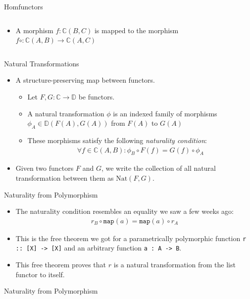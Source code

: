 \documentclass[aspectratio=169]{beamer} %
\newcommand{\bC}{\mathbb{C}}
\newcommand{\bD}{\mathbb{D}}
\begin{document}
{\begin{frame}[fragile]{Homfunctors}
\begin{columns}
\begin{itemize}
\begin{itemize}
    \item A morphism $f : \bC(B,C)$ is mapped to the morphism $f \circ : \bC(A,B) \to \bC(A,C)$
  \end{itemize}
 \end{itemize}
 \end{columns}
\end{frame}
\begin{frame}{Natural Transformations}
    \begin{itemize}
     \item A structure-preserving map between functors.
     \begin{itemize}
      \item Let $F,G : \bC \to \bD$ be functors.
      \item A natural transformation $\phi$ is an indexed family of morphisms $\phi_A \in \bD(F(A), G(A))$ from $F(A)$ to $G(A)$
      \item These morphisms satisfy the following \textit{naturality condition}:
      \begin{align*}
       \forall f \in \bC(A,B) : \phi_B \circ F(f) = G(f) \circ \phi_A
      \end{align*}
     \end{itemize}
     \item Given two functors $F$ and $G$, we write the collection of all natural transformation between them as $\text{Nat}(F, G)$.
    \end{itemize}
\end{frame}
\begin{frame}{Naturality from Polymorphism}
    \begin{itemize}
      \item The naturality condition resembles an equality we saw a few weeks ago: 
      \begin{align*}
       r_B \circ \texttt{map}(a) = \texttt{map}(a) \circ r_A
      \end{align*}
      \pause \item This is the free theorem we got for a parametrically polymorphic function \texttt{r :: [X] -> [X]} and an arbitrary function \texttt{a : A -> B}.
      \pause \item This free theorem proves that $r$ is a natural transformation from the list functor to itself.
    \end{itemize}
\end{frame}
\begin{frame}{Naturality from Polymorphism}
    \begin{itemize}

\end{itemize}
\end{frame}}
\end{document}
